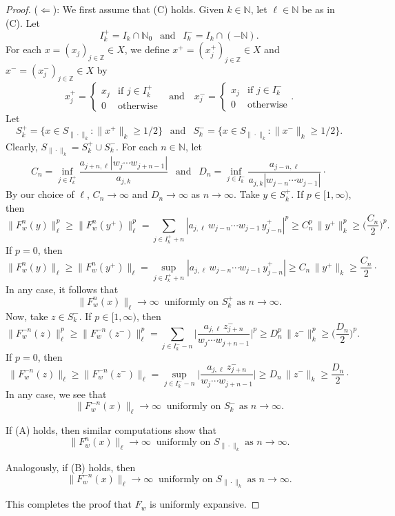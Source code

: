 \documentclass[12pt]{amsart}
\theoremstyle{theorem}
\theoremstyle{definition}
\theoremstyle{remark} \theoremstyle{question} \theoremstyle{example}
\newcommand{\N}{\mathbb{N}}   %
\newcommand{\Z}{\mathbb{Z}}   %
\begin{document}
\begin{proof}
\smallskip\noindent
($\Leftarrow$): We first assume that (C) holds. Given $k \in \N$, let $\ell \in \N$ be as in (C). Let 
\[
I_k^+ = I_k \cap \N_0 \ \ \text{ and } \ \ I_k^- = I_k \cap (-\N).
\]
For each $x = (x_j)_{j \in \Z} \in X$, we define $x^+ = (x^+_j)_{j \in \Z} \in X$ and $x^- = (x^-_j)_{j \in \Z} \in X$ by
\[
x^+_j = \left\{\begin{array}{cl} x_j & \text{if } j \in I_k^+\\ 0 & \text{otherwise} \end{array}\right. \ \ \text{ and } \ \ \
x^-_j = \left\{\begin{array}{cl} x_j & \text{if } j \in I_k^-\\ 0 & \text{otherwise} \end{array}\right..
\]
Let 
\[
S_k^+ = \{x \in S_{\|\cdot\|_k} : \|x^+\|_k \geq 1/2\} \ \ \text{ and } \ \ S_k^- = \{x \in S_{\|\cdot\|_k} : \|x^-\|_k \geq 1/2\}.
\]
Clearly, $S_{\|\cdot\|_k} = S_k^+ \cup S_k^-$. For each $n \in \N$, let
\[
C_n = \inf_{j \in I_k^+} \frac{a_{j+n,\ell} |w_j \cdots w_{j+n-1}|}{a_{j,k}} \ \ \text{ and } \ \
D_n = \inf_{j \in I_k^-} \frac{a_{j-n,\ell}}{a_{j,k} |w_{j-n} \cdots w_{j-1}|}\cdot
\]
By our choice of $\ell$, $C_n \to \infty$ and $D_n \to \infty$ as $n \to \infty$. Take $y \in S_k^+$. If $p \in [1,\infty)$, then
\[
\|F_w^n(y)\|_\ell^p \geq \|F_w^n(y^+)\|_\ell^p = \sum_{j \in I_k^+ + n} |a_{j,\ell}\, w_{j-n} \cdots w_{j-1}\, y^+_{j-n}|^p
  \geq C_n^p \, \|y^+\|_k^p \geq \Big(\frac{C_n}{2}\Big)^p.
\]
If $p = 0$, then
\[
\|F_w^n(y)\|_\ell \geq \|F_w^n(y^+)\|_\ell = \sup_{j \in I_k^+ + n} |a_{j,\ell}\, w_{j-n} \cdots w_{j-1}\, y^+_{j-n}|
  \geq C_n \, \|y^+\|_k \geq \frac{C_n}{2}\cdot
\]
In any case, it follows that 
\[
\|F_w^n(x)\|_\ell \to \infty \ \text{ uniformly on } S_k^+ \text{ as } n \to \infty.
\]
Now, take $z \in S_k^-$. If $p \in [1,\infty)$, then
\[
\|F_w^{-n}(z)\|_\ell^p \geq \|F_w^{-n}(z^-)\|_\ell^p 
  = \sum_{j \in I_k^- - n} \Big|\frac{a_{j,\ell}\, z^-_{j+n}}{w_j \cdots w_{j+n-1}}\Big|^p
  \geq D_n^p \, \|z^-\|_k^p \geq \Big(\frac{D_n}{2}\Big)^p.
\]
If $p = 0$, then
\[
\|F_w^{-n}(z)\|_\ell \geq \|F_w^{-n}(z^-)\|_\ell 
  = \sup_{j \in I_k^- - n} \Big|\frac{a_{j,\ell}\, z^-_{j+n}}{w_j \cdots w_{j+n-1}}\Big|
  \geq D_n \, \|z^-\|_k \geq \frac{D_n}{2}\cdot
\]
In any case, we see that 
\[
\|F_w^{-n}(x)\|_\ell \to \infty \ \text{ uniformly on } S_k^- \text{ as } n \to \infty.
\]

If (A) holds, then similar computations show that
\[
\|F_w^n(x)\|_\ell \to \infty \ \text{ uniformly on } S_{\|\cdot\|_k} \text{ as } n \to \infty.
\]

Analogously, if (B) holds, then
\[
\|F_w^{-n}(x)\|_\ell \to \infty \ \text{ uniformly on } S_{\|\cdot\|_k} \text{ as } n \to \infty.
\]

This completes the proof that $F_w$ is uniformly expansive.
\end{proof}
\end{document}
